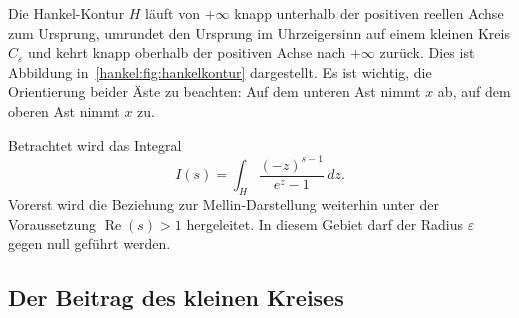 Die Hankel-Kontur $H$ läuft von $+\infty$ knapp unterhalb der positiven reellen Achse zum Ursprung, umrundet den Ursprung im Uhrzeigersinn auf einem kleinen Kreis $C_\varepsilon$ und kehrt knapp oberhalb der positiven Achse nach $+\infty$ zurück. 
Dies ist Abbildung in~\ref{hankel:fig:hankelkontur} dargestellt. 
Es ist wichtig, die Orientierung beider Äste zu beachten: Auf dem unteren Ast nimmt $x$ ab, auf dem oberen Ast nimmt $x$ zu.


%	
%	
%	
%	

Betrachtet wird das Integral
\begin{equation}
I(s)
=
\int_H
\frac{(-z)^{s-1}}{e^z-1}
\,dz.
\label{hankel:eq:hankel-integral}
\end{equation}
Vorerst wird die Beziehung zur Mellin-Darstellung weiterhin unter der Voraussetzung $\operatorname{Re}(s)>1$ hergeleitet. In diesem Gebiet darf der Radius $\varepsilon$ gegen null geführt werden.

\subsection{Der Beitrag des kleinen Kreises}

